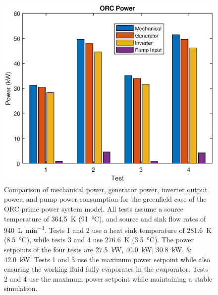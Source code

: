 \begin{figure}[p]
	\centering

	\includegraphics[width=\textwidth]{figures/gfPower}

	\caption{Comparison of mechanical power, generator power, inverter output power, and pump power consumption for the greenfield case of the ORC prime power system model. All tests assume a source temperature of \SI{364.5}{\kelvin} (\SI{91}{\degreeCelsius}), and source and sink flow rates of \SI{940}{\liter\per\minute}. Tests 1 and 2 use a heat sink temperature of \SI{281.6}{\kelvin} (\SI{8.5}{\degreeCelsius}), while tests 3 and 4 use \SI{276.6}{\kelvin} (\SI{3.5}{\degreeCelsius}). The power setpoints of the four tests are \SIlist{27.5;40.0;30.8;42.0}{\kilo\watt}. Tests 1 and 3 use the maximum power setpoint while also ensuring the working fluid fully evaporates in the evaporator. Tests 2 and 4 use the maximum power setpoint while maintaining a stable simulation. }
	\label{fig:gfPower}
\end{figure}